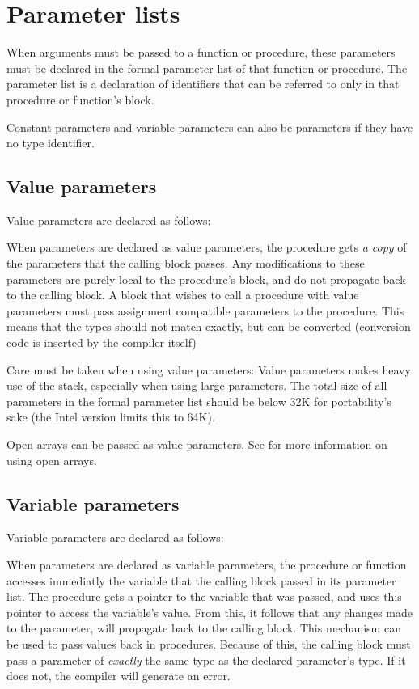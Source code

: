 \section{Parameter lists}
\label{se:Parameters}
When arguments must be passed to a function or procedure, these parameters
must be declared in the formal parameter list of that function or procedure.
The parameter list is a declaration of identifiers that can be referred to
only in that procedure or function's block.

Constant parameters and variable parameters can also be 
parameters if they have no type identifier.
\subsection{Value parameters}
Value parameters are declared as follows:

When parameters are declared as value parameters, the procedure gets {\em
a copy} of the parameters that the calling block passes. Any modifications
to these parameters are purely local to the procedure's block, and do not
propagate back to the calling block.
A block that wishes to call a procedure with value parameters must pass
assignment compatible parameters to the procedure. This means that the types
should not match exactly, but can be converted (conversion code is inserted
by the compiler itself)

Care must be taken when using value parameters: Value parameters makes heavy
use of the stack, especially when using large parameters. The total size of
all parameters in the formal parameter list should be below 32K for
portability's sake (the Intel version limits this to 64K).

Open arrays can be passed as value parameters. See  for
more information on using open arrays.
\subsection{Variable parameters}
\label{se:varparams}
Variable parameters are declared as follows:

When parameters are declared as variable parameters, the procedure or
function accesses immediatly the variable that the calling block passed in
its parameter list. The procedure gets a pointer to the variable that was
passed, and uses this pointer to access the variable's value.
From this, it follows that any changes made to the parameter, will
propagate back to the calling block. This mechanism can be used to pass
values back in procedures.
Because of this, the calling block must pass a parameter of {\em exactly}
the same type as the declared parameter's type. If it does not, the compiler
will generate an error.

